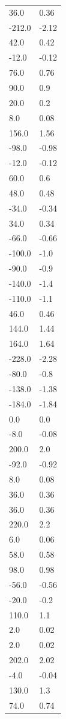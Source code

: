 \begin{longtable}{ll}
36.0 & 0.36 \\
-212.0 & -2.12 \\
42.0 & 0.42 \\
-12.0 & -0.12 \\
76.0 & 0.76 \\
90.0 & 0.9 \\
20.0 & 0.2 \\
8.0 & 0.08 \\
156.0 & 1.56 \\
-98.0 & -0.98 \\
-12.0 & -0.12 \\
60.0 & 0.6 \\
48.0 & 0.48 \\
-34.0 & -0.34 \\
34.0 & 0.34 \\
-66.0 & -0.66 \\
-100.0 & -1.0 \\
-90.0 & -0.9 \\
-140.0 & -1.4 \\
-110.0 & -1.1 \\
46.0 & 0.46 \\
144.0 & 1.44 \\
164.0 & 1.64 \\
-228.0 & -2.28 \\
-80.0 & -0.8 \\
-138.0 & -1.38 \\
-184.0 & -1.84 \\
0.0 & 0.0 \\
-8.0 & -0.08 \\
200.0 & 2.0 \\
-92.0 & -0.92 \\
8.0 & 0.08 \\
36.0 & 0.36 \\
36.0 & 0.36 \\
220.0 & 2.2 \\
6.0 & 0.06 \\
58.0 & 0.58 \\
98.0 & 0.98 \\
-56.0 & -0.56 \\
-20.0 & -0.2 \\
110.0 & 1.1 \\
2.0 & 0.02 \\
2.0 & 0.02 \\
202.0 & 2.02 \\
-4.0 & -0.04 \\
130.0 & 1.3 \\
74.0 & 0.74 \\

\end{longtable}
